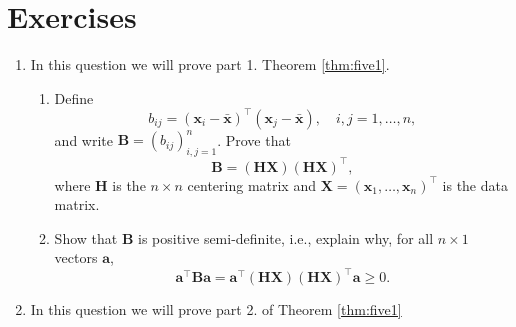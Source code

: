 \documentclass[
]{book}
\theoremstyle{definition}
\theoremstyle{definition}
\theoremstyle{definition}
\theoremstyle{definition}
\theoremstyle{remark}
\begin{document}
\section{Exercises}\label{exercises-3}

\begin{enumerate}
\def\labelenumi{\arabic{enumi}.}
\item
  In this question we will prove part 1. Theorem \ref{thm:five1}.

  \begin{enumerate}
  \def\labelenumii{\roman{enumii}.}
  \item
    Define
    \[
    b_{ij}=(\mathbf x_i-\bar{\mathbf x})^\top (\mathbf x_j-\bar{\mathbf x}), \quad i,j=1, \ldots , n,
    \]
    and write \(\mathbf B=(b_{ij})_{i,j=1}^n\). Prove that \[\mathbf B=(\mathbf H\mathbf X)(\mathbf H\mathbf X)^\top,\] where
    \(\mathbf H\) is the \(n \times n\) centering matrix and \(\mathbf X= (\mathbf x_1, \ldots , \mathbf x_n)^\top\) is the data matrix.
  \item
    Show that \(\mathbf B\) is positive semi-definite, i.e., explain why, for
    all \(n \times 1\) vectors \(\mathbf a\),
    \[
    \mathbf a^\top \mathbf B\mathbf a=\mathbf a^\top (\mathbf H\mathbf X) (\mathbf H\mathbf X)^\top \mathbf a\geq 0. 
    \]
  \end{enumerate}
\item
  In this question we will prove part 2. of Theorem \ref{thm:five1}


\end{enumerate}
\end{document}

